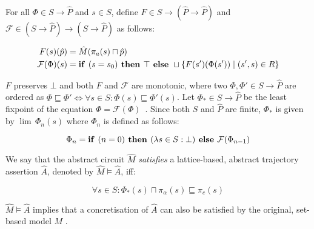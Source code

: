 For all $\Phi \in S \rightarrow \hat P$ and $s \in S$, define $F \in S \rightarrow (\hat P \rightarrow \hat P)$ and $\mathcal{F} \in (S \rightarrow \hat P) \rightarrow (S \rightarrow \hat P)$ as follows:

\begin{align}
F(s)(\hat p) &= \hat M(\pi_{a}(s) \sqcap \hat p) \\
\mathcal{F}(\Phi)(s) &= \textrm{\textbf{if }} (s = s_{0}) \textrm{\textbf{ then }} \top \textrm{\textbf{ else }} \sqcup \{ F(s')(\Phi(s')) \mid (s',s) \in R \}
\end{align}

\noindent $F$ preserves $\bot$ and both $F$ and $\mathcal{F}$ are monotonic, where two $\Phi, \Phi' \in S \rightarrow \hat P$ are ordered as $\Phi \sqsubseteq \Phi' \iff \forall s \in S : \Phi(s) \sqsubseteq \Phi'(s)$. Let $\Phi_{*} \in S \rightarrow \hat P$ be the least fixpoint of the equation $\Phi = \mathcal{F}(\Phi)$~\cite{davey2002}. Since both $S$ and $\hat P$ are finite, $\Phi_{*}$ is given by $\lim \, \Phi_{n}(s)$ where $\Phi_{n}$ is defined as follows:

\begin{equation}
\Phi_{n} = \textrm{\textbf{if }} (n = 0) \textrm{\textbf{ then }} (\lambda s \in S : \bot) \textrm{\textbf{ else }} \mathcal{F}(\Phi_{n-1})
\end{equation}

We say that the abstract circuit $\hat M$ \textit{satisfies} a lattice-based, abstract trajectory assertion $\hat A$, denoted by $\hat M \models \hat A$, iff:

\begin{equation}
\forall s \in S : \Phi_{*}(s) \sqcap \pi_{\alpha}(s) \sqsubseteq \pi_{c}(s)
\end{equation}

\noindent $\hat M \models \hat A$ implies that a concretisation of $\hat A$ can also be satisfied by the original, set-based model $M$ \cite{chou1999}.
